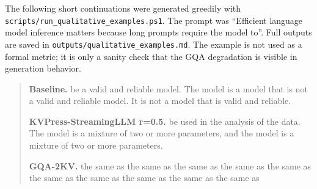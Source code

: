 \documentclass{article}
\begin{document}
The following short continuations were generated greedily with \texttt{scripts/run\_qualitative\_examples.ps1}. The prompt was ``Efficient language model inference matters because long prompts require the model to''. Full outputs are saved in \texttt{outputs/qualitative\_examples.md}. The example is not used as a formal metric; it is only a sanity check that the GQA degradation is visible in generation behavior.

{\small
\begin{quote}
\textbf{Baseline.} be a valid and reliable model. The model is a model that is not a valid and reliable model. It is not a model that is valid and reliable.

\textbf{KVPress-StreamingLLM r=0.5.} be used in the analysis of the data. The model is a mixture of two or more parameters, and the model is a mixture of two or more parameters.

\textbf{GQA-2KV.} the same as the same as the same as the same as the same as the same as the same as the same as the same as the same as
\end{quote}
}
\end{document}
